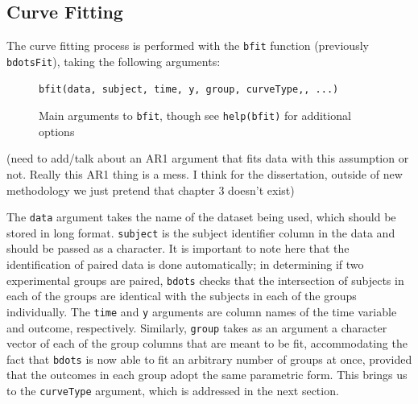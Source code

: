 \documentclass{article}
\newcommand{\xt}{\texttt}%
\begin{document}
\subsection{Curve Fitting}

The curve fitting process is performed with the \texttt{bfit} function (previously \texttt{bdotsFit}), taking the following arguments:


\begin{figure}[h!]
\centering
\begin{BVerbatim}
bfit(data, subject, time, y, group, curveType,, ...)
\end{BVerbatim}
\caption{Main arguments to \xt{bfit}, though see \xt{help(bfit)} for additional options}
\end{figure}


(need to add/talk about an AR1 argument that fits data with this assumption or not. Really this AR1 thing is a mess. I think for the dissertation, outside of new methodology we just pretend that chapter 3 doesn't exist)

The \xt{data} argument takes the name of the dataset being used, which should be stored in long format. \xt{subject} is the subject identifier column in the data and should be passed as a character. It is important to note here that the identification of paired data is done automatically; in determining if two experimental groups are paired, \xt{bdots} checks that the intersection of subjects in each of the groups are identical with the subjects in each of the groups individually. The \xt{time} and \xt{y} arguments are column names of the time variable and outcome, respectively. Similarly, \xt{group} takes as an argument a character vector of each of the group columns that are meant to be fit, accommodating the fact that \xt{bdots} is now able to fit an arbitrary number of groups at once, provided that the outcomes in each group adopt the same parametric form. This brings us to the \xt{curveType} argument, which is addressed in the next section.
\end{document}
